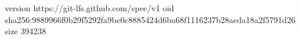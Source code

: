 version https://git-lfs.github.com/spec/v1
oid sha256:9889966f0b29f5292fa9be0c8885424d6ba68f1116237b28aeda18a2f5791d26
size 394238
